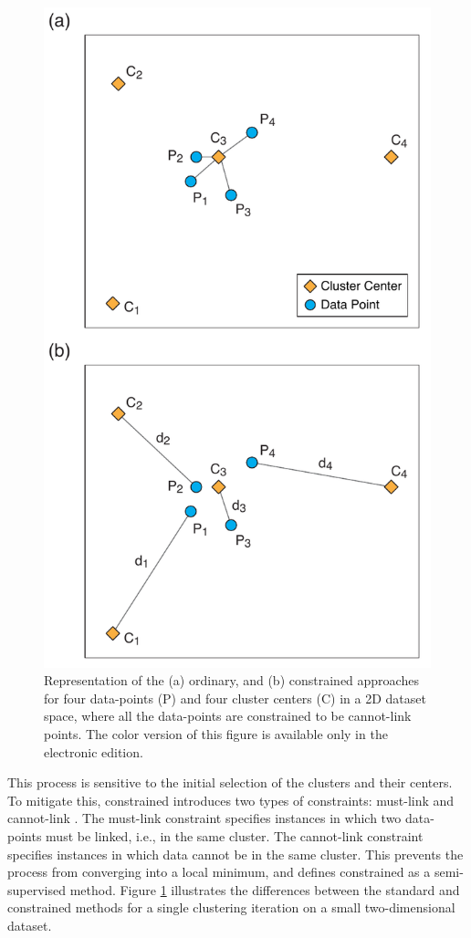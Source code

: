 \begin{figure}[ht!]
	\centering
	\includegraphics[width=\columnwidth]{figures/pdf/figure-04}
	\caption{Representation of the (a) ordinary, and (b) constrained \kmeans{} approaches for four data-points (P) and four cluster centers (C) in a 2D dataset space, where all the data-points are constrained to be cannot-link points. The color version of this figure is available only in the electronic edition.}
	\label{fig:k-means}
\end{figure}

This process is sensitive to the initial selection of the clusters and their centers. To mitigate this, constrained \kmeans{} introduces two types of constraints: must-link and cannot-link \citep{Wagstaff_2001_Proc}. The must-link constraint specifies instances in which two data-points must be linked, i.e., in the same cluster. The cannot-link constraint specifies instances in which data cannot be in the same cluster. This prevents the process from converging into a local minimum, and defines constrained \kmeans{} as a semi-supervised method. Figure \ref{fig:k-means} illustrates the differences between the standard and constrained \kmeans{} methods for a single clustering iteration on a small two-dimensional dataset.

